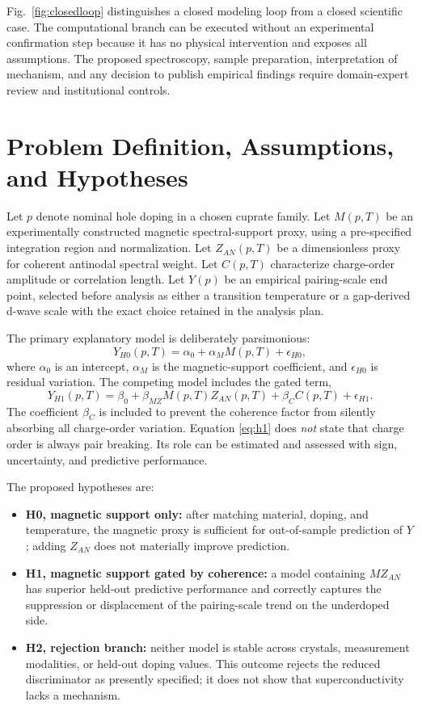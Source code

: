 \documentclass[conference]{IEEEtran}
\begin{document}
Fig.~\ref{fig:closedloop} distinguishes a closed modeling loop from a closed scientific case. The computational branch can be executed without an experimental confirmation step because it has no physical intervention and exposes all assumptions. The proposed spectroscopy, sample preparation, interpretation of mechanism, and any decision to publish empirical findings require domain-expert review and institutional controls.

\section{Problem Definition, Assumptions, and Hypotheses}

Let $p$ denote nominal hole doping in a chosen cuprate family. Let $M(p,T)$ be an experimentally constructed magnetic spectral-support proxy, using a pre-specified integration region and normalization. Let $Z_{AN}(p,T)$ be a dimensionless proxy for coherent antinodal spectral weight. Let $C(p,T)$ characterize charge-order amplitude or correlation length. Let $Y(p)$ be an empirical pairing-scale end point, selected before analysis as either a transition temperature or a gap-derived d-wave scale with the exact choice retained in the analysis plan.

The primary explanatory model is deliberately parsimonious:
\begin{equation}
Y_{H0}(p,T)=\alpha_0+\alpha_M M(p,T)+\epsilon_{H0},
\label{eq:h0}
\end{equation}
where $\alpha_0$ is an intercept, $\alpha_M$ is the magnetic-support coefficient, and $\epsilon_{H0}$ is residual variation. The competing model includes the gated term,
\begin{equation}
Y_{H1}(p,T)=\beta_0+\beta_{MZ}M(p,T)Z_{AN}(p,T)+\beta_C C(p,T)+\epsilon_{H1}.
\label{eq:h1}
\end{equation}
The coefficient $\beta_C$ is included to prevent the coherence factor from silently absorbing all charge-order variation. Equation \eqref{eq:h1} does \emph{not} state that charge order is always pair breaking. Its role can be estimated and assessed with sign, uncertainty, and predictive performance.

The proposed hypotheses are:

\begin{itemize}
\item \textbf{H0, magnetic support only:} after matching material, doping, and temperature, the magnetic proxy is sufficient for out-of-sample prediction of $Y$; adding $Z_{AN}$ does not materially improve prediction.
\item \textbf{H1, magnetic support gated by coherence:} a model containing $MZ_{AN}$ has superior held-out predictive performance and correctly captures the suppression or displacement of the pairing-scale trend on the underdoped side.
\item \textbf{H2, rejection branch:} neither model is stable across crystals, measurement modalities, or held-out doping values. This outcome rejects the reduced discriminator as presently specified; it does not show that superconductivity lacks a mechanism.
\end{itemize}
\end{document}
